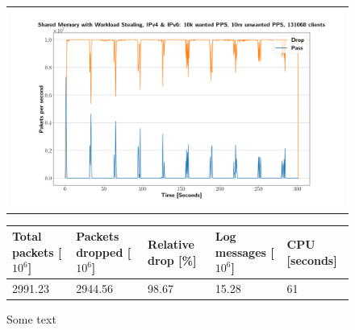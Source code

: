 \begin{figure}[p]
	\label{fig:simplefail2ban:shm:ws}
	\centering
	\scriptsize
	\begin{tabular}{c}
    	\centerline{\includegraphics[width=1.2\textwidth]{images/simplefail2ban_shm_ws_ipv46_v10k_iv10m_c131068.png}}
	\end{tabular}
	\begin{tabular}{lllll}
		\toprule
		\textbf{Total packets [$10^6$]} & \textbf{Packets dropped [$10^6$]} & \textbf{Relative drop [\%]} & \textbf{Log messages [$10^6$]} & \textbf{CPU [seconds]} \\ \midrule 
		2991.23 & 2944.56 & 98.67 & 15.28 & 61 \\
		\bottomrule
	\end{tabular}
	\caption[Simplefail2ban, Shared Memory with Workload Sharing]{Some text}
\end{figure}

